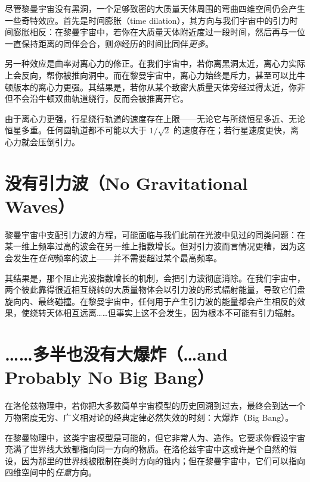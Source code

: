 
尽管黎曼宇宙没有黑洞，一个足够致密的大质量天体周围的弯曲四维空间仍会产生一些奇特效应。首先是时间膨胀（time dilation），其方向与我们宇宙中的引力时间膨胀相反：在黎曼宇宙中，若你在大质量天体附近度过一段时间，然后再与一位一直保持距离的同伴会合，则\emph{你}经历的时间比同伴\emph{更多}。

另一种效应是曲率对离心力的修正。在我们宇宙中，若你离黑洞太近，离心力实际上会反向，帮你被推向洞中。而在黎曼宇宙中，离心力始终是斥力，甚至可以比牛顿版本的离心力更强。其结果是，若你从某个致密大质量天体旁经过得太近，你非但不会沿牛顿双曲轨道绕行，反而会被推离开它。

由于离心力更强，行星绕行轨道的速度存在上限——无论它与所绕恒星多近、无论恒星多重。任何圆轨道都不可能以大于 $1/\sqrt2$ 的速度存在；若行星速度更快，离心力就会压倒引力。

\section{没有引力波（No Gravitational Waves）}

黎曼宇宙中支配引力波的方程，可能面临与我们此前在光波中见过的同类问题：在某一维上频率过高的波会在另一维上指数增长。但对引力波而言情况更糟，因为这会发生在\emph{任何}频率的波上——并不需要超过某个最高频率。

其结果是，那个阻止光波指数增长的机制，会把引力波彻底消除。在我们宇宙中，两个彼此靠得很近相互绕转的大质量物体会以引力波的形式辐射能量，导致它们盘旋向内、最终碰撞。在黎曼宇宙中，任何用于产生引力波的能量都会产生相反的效果，使绕转天体相互远离……但事实上这不会发生，因为根本不可能有引力辐射。

\section{……多半也没有大爆炸（\ldots and Probably No Big Bang）}


在洛伦兹物理中，若你把大多数简单宇宙模型的历史回溯到过去，最终会到达一个万物密度无穷、广义相对论的经典定律必然失效的时刻：大爆炸（Big Bang）。

在黎曼物理中，这类宇宙模型是可能的，但它非常人为、造作。它要求你假设宇宙充满了世界线大致都指向同一方向的物质。在洛伦兹宇宙中这或许是个自然的假设，因为那里的世界线被限制在类时方向的锥内；但在黎曼宇宙中，它们可以指向四维空间中的\emph{任意}方向。

